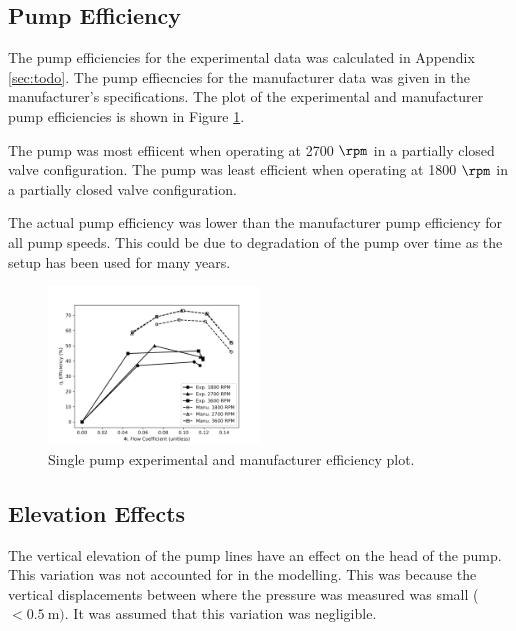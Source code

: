 \subsection{Pump Efficiency}
The pump efficiencies for the experimental data was calculated in Appendix \ref{sec:todo}. The pump effiecncies for the manufacturer data was given in the manufacturer's specifications. The plot of the experimental and manufacturer pump efficiencies is shown in Figure \ref{fig:single_pump_efficiency_plot}.

The pump was most effiicent when operating at 2700 $\unit{\rpm}$ in a partially closed valve configuration. The pump was least efficient when operating at 1800 $\unit{\rpm}$ in a partially closed valve configuration. 

The actual pump efficiency was lower than the manufacturer pump efficiency for all pump speeds. This could be due to degradation of the pump over time as the setup has been used for many years. 
\begin{figure}[h]
    \centering
    \includegraphics[width=0.5\textwidth]{Sections/Figures/Single Pump Efficiency Plot.png}
    \caption{Single pump experimental and manufacturer efficiency plot.}
    \label{fig:single_pump_efficiency_plot}
\end{figure}

\subsection{Elevation Effects}
The vertical elevation of the pump lines have an effect on the head of the pump. This variation was not accounted for in the modelling. This was because the vertical displacements between where the pressure was measured was small ($< \qty{0.5}{\meter})$. It was assumed that this variation was negligible.